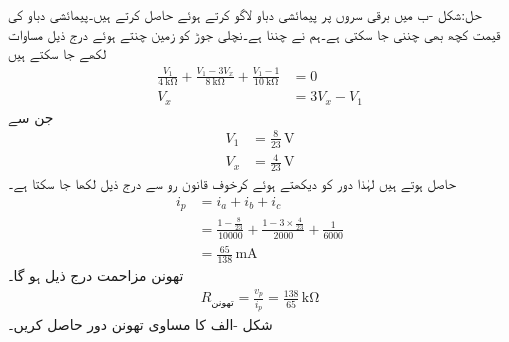 حل:شکل -ب میں برقی سروں  پر پیمائشی دباو لاگو کرتے ہوئے  حاصل کرتے ہیں۔پیمائشی دباو کی قیمت کچھ بھی چننی جا سکتی ہے۔ہم نے   چننا ہے۔نچلی جوڑ کو زمین چنتے ہوئے  درج ذیل مساوات لکھے جا سکتے ہیں
\begin{align*}
\frac{V_1}{\SI{4}{\kilo\ohm}}+\frac{V_1-3V_x}{\SI{8}{\kilo\ohm}}+\frac{V_1-1}{\SI{10}{\kilo\ohm}}&=0\\
V_x&=3V_x-V_1
\end{align*}
جن سے
\begin{align*}
V_1&=\frac{8}{23}\,\si{\volt}\\
V_x&=\frac{4}{23}\, \si{\volt}
\end{align*}
حاصل ہوتے ہیں لہٰذا دور کو دیکھتے ہوئے کرخوف قانون رو سے درج ذیل لکھا جا سکتا ہے۔
\begin{align*}
i_p&=i_a+i_b+i_c\\
&=\frac{1-\frac{8}{23}}{10000}+\frac{1-3\times \frac{4}{23}}{2000}+\frac{1}{6000}\\
&=\frac{65}{138}\, \si{\milli\ampere}
\end{align*}
تھونن مزاحمت درج ذیل ہو گا۔
\begin{align*}
R_{\text{تھونن}}=\frac{v_p}{i_p}=\frac{138}{65} \, \si{\kilo\ohm}
\end{align*}
شکل -الف کا مساوی تھونن دور حاصل کریں۔

